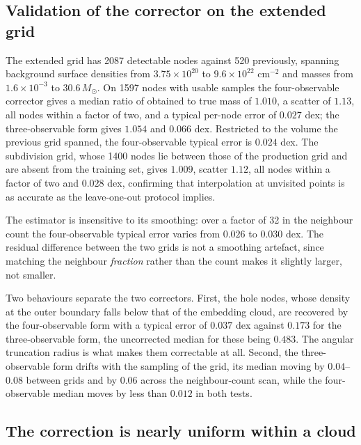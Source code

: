 \documentclass[11pt,a4paper]{article}
\begin{document}
\subsection{Validation of the corrector on the extended grid}
\label{sec:practice-valid}

The extended grid has 2087 detectable nodes against 520 previously, spanning
background surface densities from $3.75\times10^{20}$ to $9.6\times10^{22}$
cm$^{-2}$ and masses from $1.6\times10^{-3}$ to $30.6\,M_\odot$. On 1597 nodes
with usable samples the four-observable corrector gives a median ratio of
obtained to true mass of $1.010$, a scatter of $1.13$, all nodes within a factor
of two, and a typical per-node error of $0.027$ dex; the three-observable form
gives $1.054$ and $0.066$ dex. Restricted to the volume the previous grid
spanned, the four-observable typical error is $0.024$ dex. The subdivision
grid, whose 1400 nodes lie between those of the production grid and are absent
from the training set, gives $1.009$, scatter $1.12$, all nodes within a factor
of two and $0.028$ dex, confirming that interpolation at unvisited points is as
accurate as the leave-one-out protocol implies.

The estimator is insensitive to its smoothing: over a factor of 32 in the
neighbour count the four-observable typical error varies from $0.026$ to
$0.030$ dex. The residual difference between the two grids is not a smoothing
artefact, since matching the neighbour \emph{fraction} rather than the count
makes it slightly larger, not smaller.

Two behaviours separate the two correctors. First, the hole nodes, whose
density at the outer boundary falls below that of the embedding cloud, are
recovered by the four-observable form with a typical error of $0.037$ dex
against $0.173$ for the three-observable form, the uncorrected median for these
being $0.483$. The angular truncation radius is what makes them correctable at
all. Second, the three-observable form drifts with the sampling of the grid,
its median moving by $0.04$--$0.08$ between grids and by $0.06$ across the
neighbour-count scan, while the four-observable median moves by less than
$0.012$ in both tests.

\subsection{The correction is nearly uniform within a cloud}
\label{sec:practice-uniform}
\end{document}
